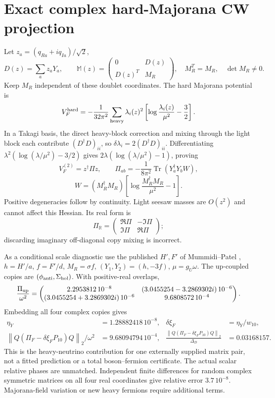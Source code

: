 \documentclass[11pt]{article}
\newcommand{\norm}[1]{\left\lVert#1\right\rVert_2}
\newcommand{\tr}{\operatorname{Tr}}
\begin{document}
\section{Exact complex hard-Majorana CW projection}
Let $z_a=(q_{Ra}+iq_{Ia})/\sqrt2$,
\[
D(z)=\sum_a z_aY_a,\qquad
\mathbb M(z)=\begin{pmatrix}0&D(z)\\D(z)^T&M_R\end{pmatrix},
\quad M_R^T=M_R,\quad \det M_R\ne0.
\]
Keep $M_R$ independent of these doublet coordinates.
The hard Majorana potential is
\[
V_F^{\rm hard}=-\frac1{32\pi^2}\sum_{\rm heavy}\lambda_i(z)^2
\left[\log\frac{\lambda_i(z)}{\mu^2}-\frac32\right].
\]
In a Takagi basis, the direct heavy-block correction and mixing through
the light block each contribute $(D^\dagger D)_{ii}$, so
$\delta\lambda_i=2(D^\dagger D)_{ii}$.
Differentiating $\lambda^2(\log(\lambda/\mu^2)-3/2)$ gives
$2\lambda(\log(\lambda/\mu^2)-1)$, proving
\begin{equation}
V_F^{(2)}=z^\dagger\Pi z,\qquad
\boxed{\Pi_{ab}=-\frac1{8\pi^2}\tr(Y_a^\dagger Y_bW),}
\label{eq:cw}
\end{equation}
\[
W=(M_R^\dagger M_R)\left[\log\frac{M_R^\dagger M_R}{\mu^2}-1\right].
\]
Positive degeneracies follow by continuity. Light seesaw masses are
$O(z^2)$ and cannot affect this Hessian.
Its real form is
\[
\Pi_{\mathbb R}=
\begin{pmatrix}\Re\Pi&-\Im\Pi\\\Im\Pi&\Re\Pi\end{pmatrix};
\]
discarding imaginary off-diagonal copy mixing is incorrect.

As a conditional scale diagnostic use the published $H',F'$ of
Mummidi--Patel \cite{mp}, $h=H'/a$, $f=F'/d$,
$M_R=\sigma f$, $(Y_1,Y_2)=(h,-3f)$, $\mu=g_U\omega$.
The up-coupled copies are $(\phi_{\rm anti},\Sigma_{\rm hol})$.
With positive-real overlaps,
\[
\frac{\Pi_{\rm up}}{\omega^2}=
\begin{pmatrix}
2.2953812\,10^{-8}&(3.0455254-3.2869302i)\,10^{-6}\\
(3.0455254+3.2869302i)\,10^{-6}&9.6808572\,10^{-4}
\end{pmatrix}.
\]
Embedding all four complex copies gives
\begin{align}
\eta_Y&=1.28882418\,10^{-8},&
\delta\xi_F&=\eta_Y/w_{10},\\
\norm{Q(\Pi_F-\delta\xi_FP_{10})Q}/\omega^2&=9.68094794\,10^{-4},&
\frac{\norm{Q(\Pi_F-\delta\xi_FP_{10})Q}}{\Delta_D}&=0.03168157.
\end{align}
This is the heavy-neutrino contribution for one externally supplied
matrix pair, not a fitted prediction or a total boson--fermion
certificate. The actual scalar relative phases are unmatched.
Independent finite differences for random complex symmetric matrices
on all four real coordinates give relative error $3.7\,10^{-8}$.
Majorana-field variation or new heavy fermions require additional terms.
\end{document}
